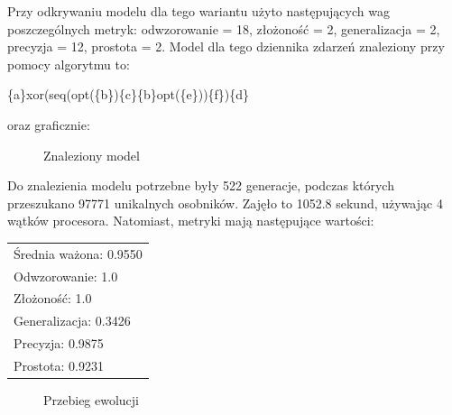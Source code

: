 Przy odkrywaniu modelu dla tego wariantu użyto następujących wag poszczególnych metryk: odwzorowanie = 18, złożoność = 2, generalizacja = 2, precyzja = 12, prostota = 2. Model dla tego dziennika zdarzeń znaleziony przy pomocy algorytmu to:
\begin{center}
	\{a\}xor(seq(opt(\{b\})\{c\}\{b\}opt(\{e\}))\{f\})\{d\}
\end{center}
oraz graficznie:

\begin{figure}[!ht]
	\caption{\label{fig:flow_chart}Znaleziony model}
\end{figure}

Do znalezienia modelu potrzebne były 522 generacje, podczas których przeszukano 97771 unikalnych osobników. Zajęło to 1052.8 sekund, używając 4 wątków procesora. Natomiast, metryki mają następujące wartości: 

 \begin{center}
  \begin{tabular}{l}
	Średnia ważona: 0.9550 \\
	Odwzorowanie: 1.0 \\
	Złożoność: 1.0 \\
	Generalizacja: 0.3426 \\
	Precyzja: 0.9875 \\
	Prostota: 0.9231
  \end{tabular}
 \end{center}
 
\begin{figure}[!ht]
	\caption{\label{fig:flow_chart}Przebieg ewolucji}
\end{figure}

